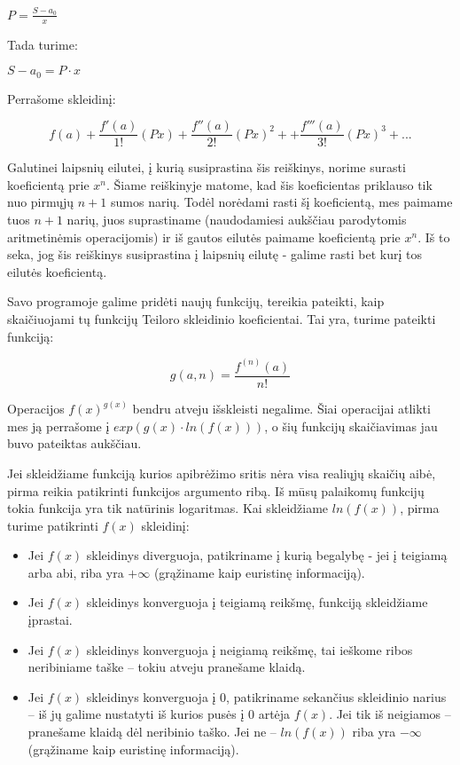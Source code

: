 	$P = \frac{S - a_0}{x}$
	
	Tada turime: 
	
	$S - a_0 = P \cdotp x$
	
	Perrašome skleidinį:
	
	\[f(a) + \frac{f'(a)}{1!}(Px)+\frac{f''(a)}{2!}(Px)^2 + +\frac{f'''(a)}{3!}(Px)^3 + ...\]
	
	Galutinei laipsnių eilutei, į kurią susiprastina šis reiškinys, norime surasti koeficientą prie $x^n$. 
	Šiame reiškinyje matome, kad šis koeficientas priklauso tik nuo pirmųjų $n+1$ sumos narių. 
	Todėl norėdami rasti šį koeficientą, mes paimame tuos $n+1$ narių, juos suprastiname (naudodamiesi aukščiau parodytomis aritmetinėmis operacijomis) 
	ir iš gautos eilutės paimame koeficientą prie $x^n$. 
	Iš to seka, jog šis reiškinys susiprastina į laipsnių eilutę - galime rasti bet kurį tos eilutės koeficientą.
	
	Savo programoje galime pridėti naujų funkcijų, tereikia pateikti, kaip skaičiuojami tų funkcijų Teiloro skleidinio koeficientai. 
	Tai yra, turime pateikti funkciją: 
	
	\[ g(a,n) = \frac{f^{(n)}(a)}{n!}\]
    
    Operacijos $f(x)^{g(x)}$ bendru atveju išskleisti negalime. Šiai operacijai atlikti mes ją perrašome į $exp(g(x) \cdotp ln(f(x)))$,
    o šių funkcijų skaičiavimas jau buvo pateiktas aukščiau.

	Jei skleidžiame funkciją kurios apibrėžimo sritis nėra visa realiųjų skaičių aibė, pirma reikia patikrinti funkcijos
	argumento ribą. Iš mūsų palaikomų funkcijų tokia funkcija yra tik natūrinis logaritmas. Kai skleidžiame $ln(f(x))$,
	pirma turime patikrinti $f(x)$ skleidinį:

	\begin{itemize}
		\item Jei $f(x)$ skleidinys diverguoja, patikriname į kurią begalybę - jei į teigiamą arba abi, riba yra $+\infty$
			(grąžiname kaip euristinę informaciją).
		\item Jei $f(x)$ skleidinys konverguoja į teigiamą reikšmę, funkciją skleidžiame įprastai.
		\item Jei $f(x)$ skleidinys konverguoja į neigiamą reikšmę, tai ieškome ribos neribiniame taške -- tokiu atveju pranešame klaidą.
		\item Jei $f(x)$ skleidinys konverguoja į 0, patikriname sekančius skleidinio narius -- iš jų galime nustatyti
			iš kurios pusės į 0 artėja $f(x)$. Jei tik iš neigiamos -- pranešame klaidą dėl neribinio taško. Jei ne --
			$ln(f(x))$ riba yra $-\infty$ (grąžiname kaip euristinę informaciją).
	\end{itemize}


